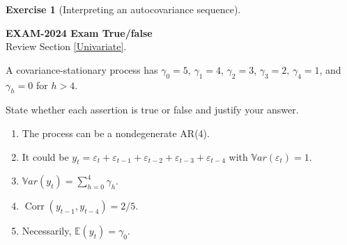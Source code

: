 \documentclass[
  11pt,
]{book}
\providecommand{\tightlist}{%
  \setlength{\itemsep}{0pt}\setlength{\parskip}{0pt}}
\theoremstyle{definition}
\theoremstyle{definition}
\theoremstyle{definition}
\newtheorem{exercise}{Exercise}[chapter]
\theoremstyle{definition}
\theoremstyle{remark}
\begin{document}
\begin{exercisebox}

\begin{exercise}[Interpreting an autocovariance sequence]
\protect\hypertarget{exr:ex-exam2024-autocovariance-sequence}{}\label{exr:ex-exam2024-autocovariance-sequence}

\textbf{EXAM-2024 \textbar{} Exam \textbar{} True/false}\\
Review Section \ref{Univariate}.

A covariance-stationary process has \(\gamma_0=5\), \(\gamma_1=4\), \(\gamma_2=3\), \(\gamma_3=2\), \(\gamma_4=1\), and \(\gamma_h=0\) for \(h>4\).

State whether each assertion is true or false and justify your answer.

\begin{enumerate}
\def\labelenumi{\arabic{enumi}.}
\tightlist
\item
  The process can be a nondegenerate AR(4).
\item
  It could be \(y_t=\varepsilon_t+\varepsilon_{t-1}+\varepsilon_{t-2}+\varepsilon_{t-3}+\varepsilon_{t-4}\) with \(\mathbb{V}ar(\varepsilon_t)=1\).
\item
  \(\mathbb{V}ar(y_t)=\sum_{h=0}^4\gamma_h\).
\item
  \(\operatorname{Corr}(y_{t-1},y_{t-4})=2/5\).
\item
  Necessarily, \(\mathbb E(y_t)=\gamma_0\).
\end{enumerate}

\end{exercise}

\end{exercisebox}

\end{document}
